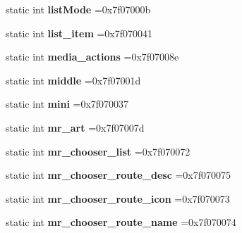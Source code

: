 \begin{DoxyCompactItemize}
static int {\bfseries list\+Mode} =0x7f07000b
\item 
\mbox{\label{classandroid_1_1support_1_1v4_1_1R_1_1id_a1d3b32468360383789352df89c3d3db1}} 
static int {\bfseries list\+\_\+item} =0x7f070041
\item 
\mbox{\label{classandroid_1_1support_1_1v4_1_1R_1_1id_a95fdc94dcf7f3b768a595cde660b42b8}} 
static int {\bfseries media\+\_\+actions} =0x7f07008e
\item 
\mbox{\label{classandroid_1_1support_1_1v4_1_1R_1_1id_a69cf926b55169255fcfbf192ddd1bc5b}} 
static int {\bfseries middle} =0x7f07001d
\item 
\mbox{\label{classandroid_1_1support_1_1v4_1_1R_1_1id_affe8961c3b68bf3430a89d3f12fd126a}} 
static int {\bfseries mini} =0x7f070037
\item 
\mbox{\label{classandroid_1_1support_1_1v4_1_1R_1_1id_ac33b0946804761c3c6211058fe9afa05}} 
static int {\bfseries mr\+\_\+art} =0x7f07007d
\item 
\mbox{\label{classandroid_1_1support_1_1v4_1_1R_1_1id_a175ec907d8328b1a6612d2981c765db8}} 
static int {\bfseries mr\+\_\+chooser\+\_\+list} =0x7f070072
\item 
\mbox{\label{classandroid_1_1support_1_1v4_1_1R_1_1id_ac422a82e37bc9caaf13dc5a218c29ae7}} 
static int {\bfseries mr\+\_\+chooser\+\_\+route\+\_\+desc} =0x7f070075
\item 
\mbox{\label{classandroid_1_1support_1_1v4_1_1R_1_1id_ad4e6c46ad271c087c414394cb0b262fb}} 
static int {\bfseries mr\+\_\+chooser\+\_\+route\+\_\+icon} =0x7f070073
\item 
\mbox{\label{classandroid_1_1support_1_1v4_1_1R_1_1id_a60c459160fc3ac5a0186fbe49a168b5d}} 
static int {\bfseries mr\+\_\+chooser\+\_\+route\+\_\+name} =0x7f070074
\item 

\end{DoxyCompactItemize}
